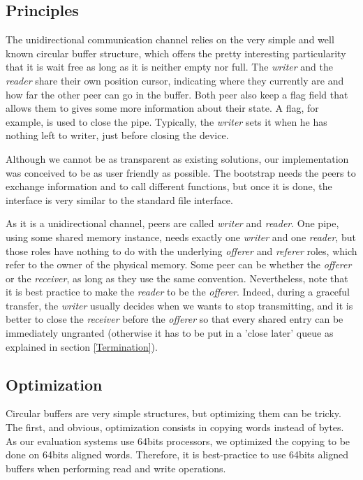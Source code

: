\documentclass[journal]{IEEEtran}
\begin{document}
\subsection{Principles}

The unidirectional communication channel relies on the very simple and well known circular buffer structure, which offers the pretty interesting particularity that it is wait free as long as it is neither empty nor full. The \emph{writer} and the \emph{reader} share their own position cursor, indicating where they currently are and how far the other peer can go in the buffer. Both peer also keep a flag field that allows them to gives some more information about their state. A flag, for example, is used to close the pipe. Typically, the \emph{writer} sets it when he has nothing left to writer, just before closing the device. 

Although we cannot be as transparent as existing solutions, our implementation was conceived to be as user friendly as possible. The bootstrap needs the peers to exchange information and to call different functions, but once it is done, the interface is very similar to the standard file interface. 

As it is a unidirectional channel, peers are called \emph{writer} and \emph{reader}. One pipe, using some shared memory instance, needs exactly one \emph{writer} and one \emph{reader}, but those roles have nothing to do with the underlying \emph{offerer} and \emph{referer} roles, which refer to the owner of the physical memory. Some peer can be whether the \emph{offerer} or the \emph{receiver}, as long as they use the same convention. Nevertheless, note that it is best practice to make the \emph{reader} to be the \emph{offerer}. Indeed, during a graceful transfer, the \emph{writer} usually decides when we wants to stop transmitting, and it is better to close the \emph{receiver} before the \emph{offerer} so that every shared entry can be immediately ungranted (otherwise it has to be put in a 'close later' queue as explained in section \ref{Termination}).

\subsection{Optimization}

Circular buffers are very simple structures, but optimizing them can be tricky. The first, and obvious, optimization consists in copying words instead of bytes. As our evaluation systems use 64bits processors, we optimized the copying to be done on 64bits aligned words. Therefore, it is best-practice to use 64bits aligned buffers when performing read and write operations. 
\end{document}
